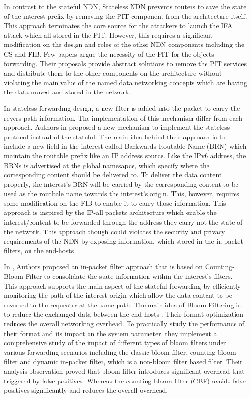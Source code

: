 \documentclass[conference]{IEEEtran}
\begin{document}
In contrast to the stateful NDN, Stateless NDN prevents routers to save the state of the interest prefix by removing the PIT component from the architecture itself. This approach terminates the core source for the attackers to launch the IFA attack which all stored in the PIT. However, this requires a significant modification on the design and roles of the other NDN components including the CS and FIB. Few papers \cite{Ghali2015}\cite{Universite2018}\cite{Azgin2016}  argue the necessity of the PIT for the objects forwarding. Their proposals provide abstract solutions to remove the PIT services and distribute them to the other components on the architecture without violating the main value of the named data networking concepts which are having the data moved and stored in the network.


In stateless forwarding design, a new filter is added into the packet to carry the revers path information. The implementation of this mechanism differ from each approach. Authors in \cite{Ghali2015} proposed a new mechanism to implement the stateless protocol instead of the stateful. The main idea behind their approach is to include a new field in the interest called Backwards Routable Name (BRN) which maintain the routable prefix like an IP address source.    
Like the IPv6 address, the BRNs is advertised at the global namesapce, which specify where the corresponding content should be delivered to. To deliver the data content properly, the interest's BRN will be carried by the corresponding content to be used as the routbale name towards the interest's origin. This, however, requires some modification on the FIB to enable it to carry those information. This approach is inspired by the IP-all packets architecture which enable the interest/content to be forwarded through the address they carry not the state of the network. This approach though could violates the security and privacy requirements of the NDN by exposing information, which stored in the in-packet filters, on the end-hosts 

In \cite{Azgin2016}, Authors proposed an in-packet filter approach that is based on Counting-Bloom Filter to consolidate the state information within the interest's filters. This approach supports the main aspect of the stateful forwarding by efficiently monitoring the path of the interest origin which allow the data content to be reversed to the requester at the same path. The main idea of Bloom Filtering is to reduce the exchanged data between the end-hosts \cite{Marandi}. Their format optimization reduces the overall networking overhead. To practically study the performance of their format and its impact on the system parameter, they implement a comprehensive study of the impact of different types of bloom filters under various forwarding scenarios including the classic bloom filter, counting bloom filter and dynamic in-packet filter, which is a non-bloom filter based filter. Their analysis observation proved that bloom filter introduces significant overhead that triggered by false positives. Whereas the counting bloom filter (CBF) avoids false positives significantly and reduces the overall overhead.
\end{document}
